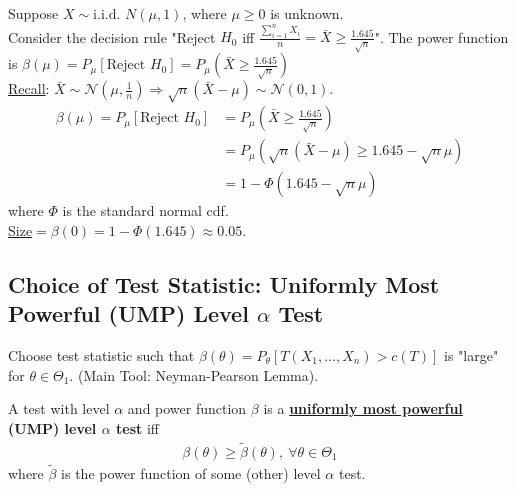 \documentclass[11pt]{elegantbook}
\begin{document}
\begin{example}
    Suppose $X\sim \text{i.i.d. } N(\mu,1)$, where $\mu\geq 0$ is unknown.\\
    Consider the decision rule "Reject $H_0$ iff $\frac{\sum_{i=1}^n X_i}{n}=\bar{X}\geq \frac{1.645}{\sqrt{n}}$". The power function is $\beta(\mu)=P_\mu[\text{Reject $H_0$}]=P_\mu(\bar{X}\geq\frac{1.645}{\sqrt{n}})$\\
    \underline{Recall}: $\bar{X}\sim \mathcal{N}(\mu,\frac{1}{n}) \Rightarrow \sqrt{n}(\bar{X}-\mu)\sim \mathcal{N}(0,1)$.
    \begin{equation}
        \begin{aligned}
            \beta(\mu)=P_\mu[\text{Reject $H_0$}]&=P_\mu(\bar{X}\geq\frac{1.645}{\sqrt{n}})\\
            &=P_\mu(\sqrt{n}(\bar{X}-\mu)\geq 1.645-\sqrt{n}\mu)\\
            &=1-\Phi(1.645-\sqrt{n}\mu)
        \end{aligned}
        \nonumber
    \end{equation}
    where $\Phi$ is the standard normal cdf.\\
    \underline{Size}$=\beta(0)=1-\Phi(1.645)\approx 0.05$.
\end{example}

\subsection{Choice of Test Statistic: Uniformly Most Powerful (UMP) Level $\alpha$ Test}
Choose test statistic such that $\beta(\theta)=P_\theta[T(X_1,...,X_n)>c(T)]$ is "large" for $\theta\in\Theta_1$. (Main Tool: Neyman-Pearson Lemma).

\begin{definition}
    \normalfont
    A test with level $\alpha$ and power function $\beta$ is a \textbf{\underline{uniformly most powerful} (UMP) level $\alpha$ test} iff
    \begin{equation}
        \begin{aligned}
            \beta(\theta)\geq \tilde{\beta}(\theta),\ \forall \theta\in\Theta_1
        \end{aligned}
        \nonumber
    \end{equation}
    where $\tilde{\beta}$ is the power function of some (other) level $\alpha$ test.
\end{definition}
\end{document}
